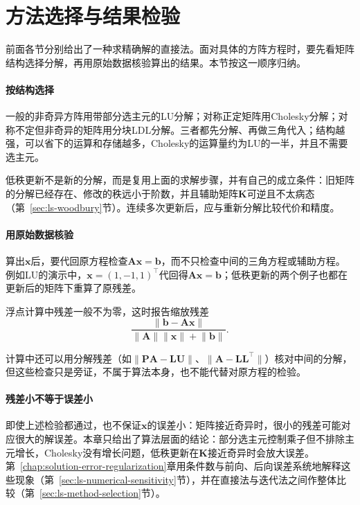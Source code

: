 \section{方法选择与结果检验}
\label{sec:ls-direct-linear-method-comparison}

前面各节分别给出了一种求精确解的直接法。面对具体的方阵方程时，要先看矩阵结构选择分解，再用原始数据核验算出的结果。本节按这一顺序归纳。

\paragraph{按结构选择}
一般的非奇异方阵用带部分选主元的LU分解；对称正定矩阵用Cholesky分解；对称不定但非奇异的矩阵用分块LDL分解。三者都先分解、再做三角代入；结构越强，可以省下的运算和存储越多，Cholesky的运算量约为LU的一半，并且不需要选主元。

低秩更新不是新的分解，而是复用上面的求解步骤，并有自己的成立条件：旧矩阵的分解已经存在、修改的秩远小于阶数，并且辅助矩阵$\bm K$可逆且不太病态（第~\ref{sec:ls-woodbury}节）。连续多次更新后，应与重新分解比较代价和精度。

\paragraph{用原始数据核验}
算出$\bm x$后，要代回原方程检查$\bm A\bm x=\bm b$，而不只检查中间的三角方程或辅助方程。例如LU的演示中，$\bm x=(1,-1,1)^\top$代回得$\bm A\bm x=\bm b$；低秩更新的两个例子也都在更新后的矩阵下重算了原残差。

浮点计算中残差一般不为零，这时报告缩放残差
\[
 \frac{\lVert\bm b-\bm A\bm x\rVert}{\lVert\bm A\rVert\lVert\bm x\rVert+\lVert\bm b\rVert} .
\]


计算中还可以用分解残差（如$\lVert\bm P\bm A-\bm L\bm U\rVert$、$\lVert\bm A-\bm L\bm L^\top\rVert$）核对中间的分解，但这些检查只是旁证，不属于算法本身，也不能代替对原方程的检验。

\paragraph{残差小不等于误差小}
即使上述检验都通过，也不保证$\bm x$的误差小：矩阵接近奇异时，很小的残差可能对应很大的解误差。本章只给出了算法层面的结论：部分选主元控制乘子但不排除主元增长，Cholesky没有增长问题，低秩更新在$\bm K$接近奇异时会放大误差。第~\ref{chap:solution-error-regularization}章用条件数与前向、后向误差系统地解释这些现象（第~\ref{sec:ls-numerical-sensitivity}节），并在直接法与迭代法之间作整体比较（第~\ref{sec:ls-method-selection}节）。
